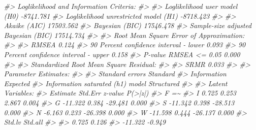 \documentclass[
  11pt,
]{krantz}
\makeatletter
\newenvironment{Shaded}{\begin{snugshade}}{\end{snugshade}}
\newcommand{\CommentTok}[1]{\textcolor[rgb]{0.37,0.37,0.37}{\textit{#1}}}
\newenvironment{kframe}{%
\medskip{}
\setlength{\fboxsep}{.8em}
 \def\at@end@of@kframe{}%
 \ifinner\ifhmode%
  \def\at@end@of@kframe{\end{minipage}}%
  \begin{minipage}{\columnwidth}%
 \fi\fi%
 \def\FrameCommand##1{\hskip\@totalleftmargin \hskip-\fboxsep
 \colorbox{shadecolor}{##1}\hskip-\fboxsep
     \hskip-\linewidth \hskip-\@totalleftmargin \hskip\columnwidth}%
 \MakeFramed {\advance\hsize-\width
   \@totalleftmargin\z@ \linewidth\hsize
   \@setminipage}}%
 {\par\unskip\endMakeFramed%
 \at@end@of@kframe}
\renewenvironment{Shaded}{\begin{kframe}}{\end{kframe}}
\theoremstyle{definition}
\theoremstyle{definition}
\theoremstyle{definition}
\theoremstyle{definition}
\theoremstyle{remark}
\makeatother
\begin{document}
\begin{Shaded}
\begin{Highlighting}[]
\CommentTok{\#\textgreater{} Loglikelihood and Information Criteria:}
\CommentTok{\#\textgreater{} }
\CommentTok{\#\textgreater{}   Loglikelihood user model (H0)              {-}8741.781}
\CommentTok{\#\textgreater{}   Loglikelihood unrestricted model (H1)      {-}8718.423}
\CommentTok{\#\textgreater{}                                                       }
\CommentTok{\#\textgreater{}   Akaike (AIC)                               17503.562}
\CommentTok{\#\textgreater{}   Bayesian (BIC)                             17546.478}
\CommentTok{\#\textgreater{}   Sample{-}size adjusted Bayesian (BIC)        17514.734}
\CommentTok{\#\textgreater{} }
\CommentTok{\#\textgreater{} Root Mean Square Error of Approximation:}
\CommentTok{\#\textgreater{} }
\CommentTok{\#\textgreater{}   RMSEA                                          0.124}
\CommentTok{\#\textgreater{}   90 Percent confidence interval {-} lower         0.093}
\CommentTok{\#\textgreater{}   90 Percent confidence interval {-} upper         0.158}
\CommentTok{\#\textgreater{}   P{-}value RMSEA \textless{}= 0.05                          0.000}
\CommentTok{\#\textgreater{} }
\CommentTok{\#\textgreater{} Standardized Root Mean Square Residual:}
\CommentTok{\#\textgreater{} }
\CommentTok{\#\textgreater{}   SRMR                                           0.033}
\CommentTok{\#\textgreater{} }
\CommentTok{\#\textgreater{} Parameter Estimates:}
\CommentTok{\#\textgreater{} }
\CommentTok{\#\textgreater{}   Standard errors                             Standard}
\CommentTok{\#\textgreater{}   Information                                 Expected}
\CommentTok{\#\textgreater{}   Information saturated (h1) model          Structured}
\CommentTok{\#\textgreater{} }
\CommentTok{\#\textgreater{} Latent Variables:}
\CommentTok{\#\textgreater{}                    Estimate  Std.Err  z{-}value  P(\textgreater{}|z|)}
\CommentTok{\#\textgreater{}   F =\textasciitilde{}                                                }
\CommentTok{\#\textgreater{}     I                 0.725    0.253    2.867    0.004}
\CommentTok{\#\textgreater{}     G               {-}11.322    0.384  {-}29.481    0.000}
\CommentTok{\#\textgreater{}     S               {-}11.342    0.398  {-}28.513    0.000}
\CommentTok{\#\textgreater{}     N                {-}6.163    0.233  {-}26.398    0.000}
\CommentTok{\#\textgreater{}     W               {-}11.598    0.444  {-}26.137    0.000}
\CommentTok{\#\textgreater{}    Std.lv  Std.all}
\CommentTok{\#\textgreater{}                   }
\CommentTok{\#\textgreater{}     0.725    0.126}
\CommentTok{\#\textgreater{}   {-}11.322   {-}0.949}

\end{Highlighting}
\end{Shaded}
\end{document}
